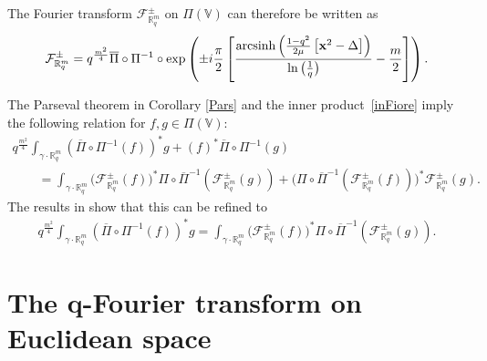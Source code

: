 \documentclass[pdftex]{sigma}
\newcommand{\mR}{\mathbb{R}}
\newcommand{\mV}{\mathbb{V}}
\newcommand{\cF}{\mathcal{F}}
\numberwithin{equation}{section}
\begin{document}
The Fourier transform $\cF^\pm_{\mR^m_q}$ on $\Pi(\mV)$ can therefore be written as
\begin{gather*}
\cF^\pm_{\mR^m_q} = q^{\frac{m^2}{4}}\overline{\Pi}\circ\Pi^{-1}\circ\exp\left(\pm i\frac{\pi}{2}\left[\frac{{\rm arcsinh}\left(\frac{1-q^2}{2\mu}\left[\bold{x}^2-\Delta\right]\right)}{\ln\big( \frac{1}{q}\big)}-\frac{m}{2}\right]\right).
\end{gather*}

The Parseval theorem in Corollary \ref{Pars} and the inner product~\eqref{inFiore} imply the following relation for $f,g\in\Pi(\mV)$:
\begin{gather*}
 q^{\frac{m^2}{4}}\int_{\gamma\cdot\mR^m_q}\left(\overline{\Pi}\circ\Pi^{-1}(f)\right)^\ast g+\left(f\right)^\ast \overline{\Pi}\circ\Pi^{-1}(g)\\
\qquad {} = \int_{\gamma\cdot\mR^m_q}\big(\cF^\pm_{\mR^m_q} (f)\big)^\ast \Pi\circ\overline{\Pi}^{-1}(\cF_{\mR^m_q}^\pm(g))+\big({\Pi}\circ\overline{\Pi}^{-1}(\cF^\pm_{\mR^m_q}(f))\big)^\ast \cF^\pm_{\mR^m_q}(g).
\end{gather*}
The results in \cite{MR1239953} show that this can be ref\/ined to
\begin{gather*}
q^{\frac{m^2}{4}}\int_{\gamma\cdot\mR^m_q}\left(\overline{\Pi}\circ\Pi^{-1}(f)\right)^\ast g = \int_{\gamma\cdot\mR^m_q}\big(\cF^\pm_{\mR^m_q} (f)\big)^\ast \Pi\circ\overline{\Pi}^{-1}(\cF_{\mR^m_q}^\pm(g)).
\end{gather*}




\section[The $q$-Fourier transform on Euclidean space]{The $\boldsymbol{q}$-Fourier transform on Euclidean space}
\label{qFeucl}
\end{document}
